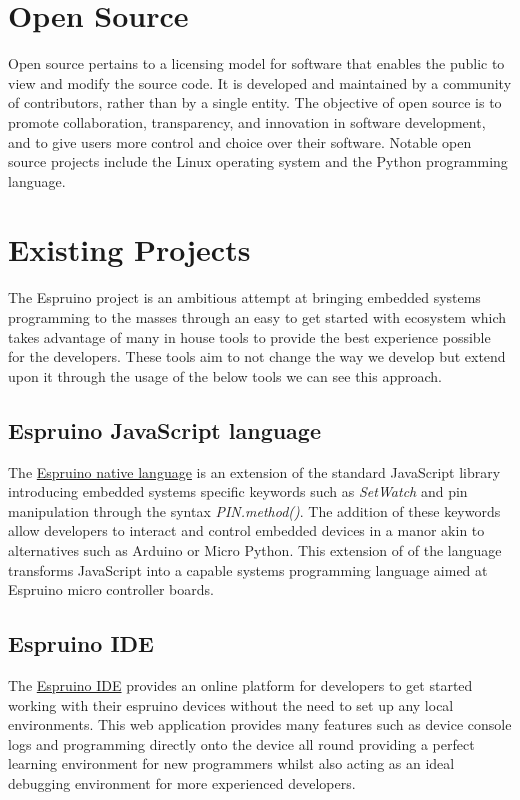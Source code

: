 \documentclass{l4proj}
\begin{document}
\section{Open Source}
\text Open source pertains to a licensing model for software that enables the public to view and modify the source code. It is developed and maintained by a community of contributors, rather than by a single entity. The objective of open source is to promote collaboration, transparency, and innovation in software development, and to give users more control and choice over their software. Notable open source projects include the Linux operating system and the Python programming language.

\section{Existing Projects}
\text The Espruino project is an ambitious attempt at bringing embedded systems programming to the masses through an easy to get started with ecosystem which takes advantage of many in house tools to provide the best experience possible for the developers. These tools aim to not change the way we develop but extend upon it through the usage of the below tools we can see this approach.

\subsection{Espruino JavaScript language}
The \href{https://www.espruino.com/Reference#top}{Espruino native language} is an extension of the standard JavaScript library introducing embedded systems specific keywords such as \textit{SetWatch} and pin manipulation through the syntax \textit{PIN.method()}. The addition of these keywords allow developers to interact and control embedded devices in a manor akin to alternatives such as Arduino or Micro Python. This extension of of the language transforms JavaScript into a capable systems programming language aimed at Espruino micro controller boards.

\subsection{Espruino IDE}
The \href{https://www.espruino.com/ide/}{Espruino IDE} provides an online platform for developers to get started working with their espruino devices without the need to set up any local environments. This web application provides many features such as device console logs and programming directly onto the device all round providing a perfect learning environment for new programmers whilst also acting as an ideal debugging environment for more experienced developers.
\end{document}
